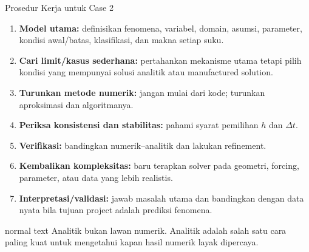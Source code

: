 \documentclass[aspectratio=169,10pt]{beamer}
\begin{document}
\begin{frame}{Prosedur Kerja untuk Case 2}
\small
\begin{enumerate}
\item \textbf{Model utama:} definisikan fenomena, variabel, domain, asumsi, parameter, kondisi awal/batas, klasifikasi, dan makna setiap suku.
\item \textbf{Cari limit/kasus sederhana:} pertahankan mekanisme utama tetapi pilih kondisi yang mempunyai solusi analitik atau manufactured solution.
\item \textbf{Turunkan metode numerik:} jangan mulai dari kode; turunkan aproksimasi dan algoritmanya.
\item \textbf{Periksa konsistensi dan stabilitas:} pahami syarat pemilihan $h$ dan $\Delta t$.
\item \textbf{Verifikasi:} bandingkan numerik--analitik dan lakukan refinement.
\item \textbf{Kembalikan kompleksitas:} baru terapkan solver pada geometri, forcing, parameter, atau data yang lebih realistis.
\item \textbf{Interpretasi/validasi:} jawab masalah utama dan bandingkan dengan data nyata bila tujuan project adalah prediksi fenomena.
\end{enumerate}
\vspace{0.08cm}
\begin{beamercolorbox}[sep=.12cm,wd=\textwidth]{normal text}
\centering
Analitik bukan lawan numerik. Analitik adalah salah satu cara paling kuat untuk mengetahui kapan hasil numerik layak dipercaya.
\end{beamercolorbox}
\end{frame}
\end{document}
